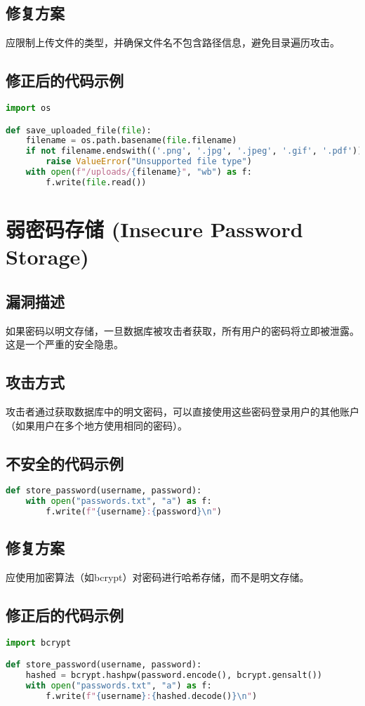 \documentclass{article}
\begin{document}
\subsection{修复方案}
应限制上传文件的类型，并确保文件名不包含路径信息，避免目录遍历攻击。

\subsection{修正后的代码示例}
\begin{lstlisting}[language=Python, caption=限制文件类型的安全代码]
import os

def save_uploaded_file(file):
    filename = os.path.basename(file.filename)
    if not filename.endswith(('.png', '.jpg', '.jpeg', '.gif', '.pdf')):
        raise ValueError("Unsupported file type")
    with open(f"/uploads/{filename}", "wb") as f:
        f.write(file.read())
\end{lstlisting}

\section{弱密码存储 (Insecure Password Storage)}

\subsection{漏洞描述}
如果密码以明文存储，一旦数据库被攻击者获取，所有用户的密码将立即被泄露。这是一个严重的安全隐患。

\subsection{攻击方式}
攻击者通过获取数据库中的明文密码，可以直接使用这些密码登录用户的其他账户（如果用户在多个地方使用相同的密码）。

\subsection{不安全的代码示例}
\begin{lstlisting}[language=Python, caption=明文存储密码的代码]
def store_password(username, password):
    with open("passwords.txt", "a") as f:
        f.write(f"{username}:{password}\n")
\end{lstlisting}

\subsection{修复方案}
应使用加密算法（如bcrypt）对密码进行哈希存储，而不是明文存储。

\subsection{修正后的代码示例}
\begin{lstlisting}[language=Python, caption=使用哈希函数存储密码的安全代码]
import bcrypt

def store_password(username, password):
    hashed = bcrypt.hashpw(password.encode(), bcrypt.gensalt())
    with open("passwords.txt", "a") as f:
        f.write(f"{username}:{hashed.decode()}\n")
\end{lstlisting}
\end{document}
